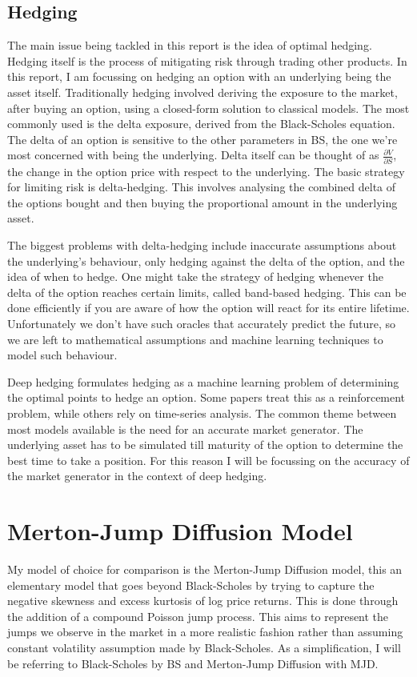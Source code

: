 \documentclass[12pt]{article}
\newcommand{\newp}
    {
    \vskip 0.5cm 
  }
\numberwithin{equation}{section}
\begin{document}
\subsection{Hedging}
The main issue being tackled in this report is the idea of optimal hedging. 
Hedging itself is the process of mitigating risk through trading other products. 
In this report, I am focussing on hedging an option with an underlying being the 
asset itself. Traditionally hedging involved deriving the exposure to the market, 
after buying an option, using a closed-form solution to classical models. The most 
commonly used is the delta exposure, derived from the Black-Scholes equation. 
The delta of an option is sensitive to the other parameters in BS, the one we're 
most concerned with being the underlying. Delta itself can be thought of as 
$\frac{\partial V}{\partial S}$, the change in the option price with respect to 
the underlying. 
The basic strategy for limiting risk is delta-hedging. This involves analysing 
the combined delta of the options bought and then buying the proportional amount 
in the underlying asset. 
\newp 
The biggest problems with delta-hedging include inaccurate assumptions about the 
underlying's behaviour, only hedging against the delta of the option, and the idea 
of when to hedge. One might take the strategy of hedging whenever the delta of 
the option reaches certain limits, called band-based hedging. This can be done 
efficiently if you are aware of how the option will react for its entire lifetime. 
Unfortunately we don't have such oracles that accurately predict the future, so 
we are left to mathematical assumptions and machine learning techniques to 
model such behaviour. 
\newp 
Deep hedging formulates hedging as a machine learning problem of determining the 
optimal points to hedge an option. Some papers treat this as a reinforcement 
problem, while others rely on time-series analysis\autocite{buehler_deep_2022}. 
The common theme between 
most models available is the need for an accurate market generator. The underlying 
asset has to be simulated till maturity of the option to determine the best time 
to take a position. For this reason I will be focussing on the accuracy of the 
market generator in the context of deep hedging. 
\clearpage

\section{Merton-Jump Diffusion Model}
My model of choice for comparison is the Merton-Jump Diffusion model, this an 
elementary model that goes beyond Black-Scholes by trying to capture the negative
skewness and excess kurtosis of log price returns. This is done through the 
addition of a compound Poisson jump process. This aims to represent the jumps 
we observe in the market in a more realistic fashion rather than assuming constant 
volatility assumption made by Black-Scholes. As a simplification, I will be referring 
to Black-Scholes by BS and Merton-Jump Diffusion with MJD.
\end{document}
